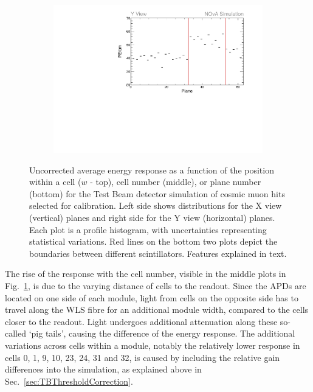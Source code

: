 \begin{figure}[h]
\begin{subfigure}[b]{0.495\textwidth}
\end{subfigure}
\begin{subfigure}[b]{0.495\textwidth}
\centering
\includegraphics[width=\textwidth]{Plots/TBCalibration/Attenprofs_Simulation_PlanePE_Y_Prof.pdf}
\end{subfigure}
\caption[Uncorrected energy response along $w$, cell and plane for simulation]{Uncorrected average energy response as a function of the position within a cell ($w$ - top), cell number (middle), or plane number (bottom) for the Test Beam detector simulation of cosmic muon hits selected for calibration. Left side shows distributions for the X view (vertical) planes and right side for the Y view (horizontal) planes. Each plot is a profile histogram, with uncertainties representing statistical variations. Red lines on the bottom two plots depict the boundaries between different scintillators. Features explained in text.}
\label{fig:Calibhist_simulation}
\end{figure}

The rise of the response with the cell number, visible in the middle plots in Fig.~\ref{fig:Calibhist_simulation}, is due to the varying distance of cells to the readout. Since the \glspl{APD} are located on one side of each module, light from cells on the opposite side has to travel along the \gls{WLS} fibre for an additional module width, compared to the cells closer to the readout. Light undergoes additional attenuation along these so-called `pig tails', causing the difference of the energy response. The additional variations across cells within a module, notably the relatively lower response in cells 0, 1, 9, 10, 23, 24, 31 and 32, is caused by including the relative gain differences into the simulation, as explained above in Sec.~\ref{sec:TBThresholdCorrection}.

